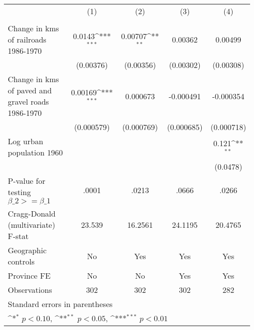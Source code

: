 {
\def\sym#1{\ifmmode^{#1}\else\(^{#1}\)\fi}
\begin{tabular}{l*{4}{c}}
\hline\hline
                &\multicolumn{1}{c}{(1)}&\multicolumn{1}{c}{(2)}&\multicolumn{1}{c}{(3)}&\multicolumn{1}{c}{(4)}\\
                &\multicolumn{1}{c}{}&\multicolumn{1}{c}{}&\multicolumn{1}{c}{}&\multicolumn{1}{c}{}\\
\hline
Change in kms of railroads 1986-1970&   0.0143\sym{***}&  0.00707\sym{**} &  0.00362         &  0.00499         \\
                &(0.00376)         &(0.00356)         &(0.00302)         &(0.00308)         \\
[1em]
Change in kms of paved and gravel roads 1986-1970&  0.00169\sym{***}& 0.000673         &-0.000491         &-0.000354         \\
                &(0.000579)         &(0.000769)         &(0.000685)         &(0.000718)         \\
[1em]
Log urban population 1960&                  &                  &                  &    0.121\sym{**} \\
                &                  &                  &                  & (0.0478)         \\
\hline
P-value for testing $\beta\_{2} >= \beta\_{1}$&    .0001         &    .0213         &    .0666         &    .0266         \\
Cragg-Donald (multivariate) F-stat&   23.539         &  16.2561         &  24.1195         &  20.4765         \\
Geographic controls&       No         &      Yes         &      Yes         &      Yes         \\
Province FE     &       No         &       No         &      Yes         &      Yes         \\
Observations    &      302         &      302         &      302         &      282         \\
\hline\hline
\multicolumn{5}{l}{\footnotesize Standard errors in parentheses}\\
\multicolumn{5}{l}{\footnotesize \sym{*} \(p<0.10\), \sym{**} \(p<0.05\), \sym{***} \(p<0.01\)}\\
\end{tabular}
}
